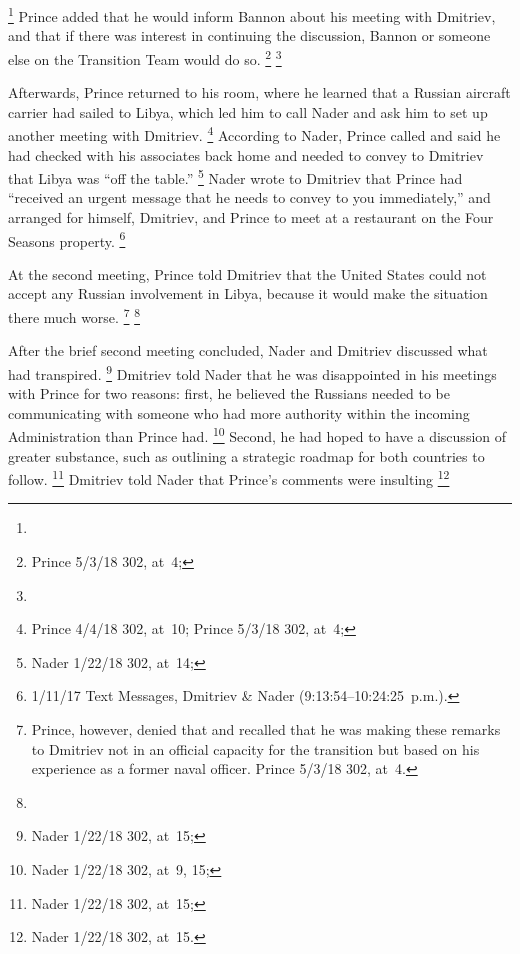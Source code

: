 \footnote{}
Prince added that he would inform Bannon about his meeting with Dmitriev, and that if there was interest in continuing the discussion, Bannon or someone else on the Transition Team would do so.%
\footnote{Prince 5/3/18 302, at~4; }
\footnote{}

Afterwards, Prince returned to his room, where he learned that a Russian aircraft carrier had sailed to Libya, which led him to call Nader and ask him to set up another meeting with Dmitriev.%
\footnote{Prince 4/4/18 302, at~10;
Prince 5/3/18 302, at~4;
}
According to Nader, Prince called and said he had checked with his associates back home and needed to convey to Dmitriev that Libya was ``off the table.''%
\footnote{Nader 1/22/18 302, at~14;
}
Nader wrote to Dmitriev that Prince had ``received an urgent message that he needs to convey to you immediately,'' and arranged for himself, Dmitriev, and Prince to meet at a restaurant on the Four Seasons property.%
\footnote{ 1/11/17 Text Messages, Dmitriev \& Nader (9:13:54--10:24:25~p.m.).}

At the second meeting, Prince told Dmitriev that the United States could not accept any Russian involvement in Libya, because it would make the situation there much worse.%
\footnote{
Prince, however, denied that and recalled that he was making these remarks to Dmitriev not in an official capacity for the transition but based on his experience as a former naval officer. Prince 5/3/18 302, at~4.}
\footnote{}

After the brief second meeting concluded, Nader and Dmitriev discussed what had transpired.%
\footnote{Nader 1/22/18 302, at~15;
}
Dmitriev told Nader that he was disappointed in his meetings with Prince for two reasons: first, he believed the Russians needed to be communicating with someone who had more authority within the incoming Administration than Prince had.%
\footnote{Nader 1/22/18 302, at~9, 15;
}
Second, he had hoped to have a discussion of greater substance, such as outlining a strategic roadmap for both countries to follow.%
\footnote{Nader 1/22/18 302, at~15;
}
Dmitriev told Nader that
Prince's comments
were insulting
\footnote{ Nader 1/22/18 302, at~15.}

